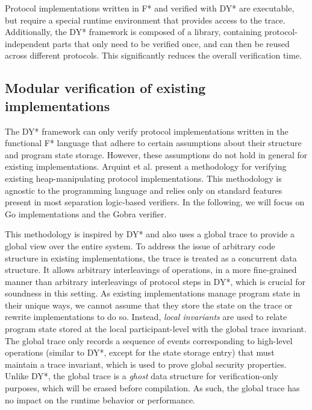\documentclass{article}
\begin{document}
Protocol implementations written in F* and verified with DY* are executable, but require a special runtime environment that provides access to the trace. Additionally, the DY* framework is composed of a library, containing protocol-independent parts that only need to be verified once, and can then be reused across different protocols. This significantly reduces the overall verification time.

\subsection{Modular verification of existing implementations}

The DY* framework can only verify protocol implementations written in the functional F* language that adhere to certain assumptions about their structure and program state storage.
However, these assumptions do not hold in general for existing implementations.
Arquint et al.\cite{arquint2022generic} present a methodology for verifying existing heap-manipulating protocol implementations. This methodology is agnostic to the programming language and relies only on standard features present in most separation logic-based verifiers. In the following, we will focus on Go implementations and the Gobra\cite{wolf2021gobra} verifier.

This methodology is inspired by DY* and also uses a global trace to provide a global view over the entire system.
To address the issue of arbitrary code structure in existing implementations, the trace is treated as a concurrent data structure. It allows arbitrary interleavings of operations, in a more fine-grained manner than arbitrary interleavings of protocol steps in DY*, which is crucial for soundness in this setting.
As existing implementations manage program state in their unique ways, we cannot assume that they store the state on the trace or rewrite implementations to do so. Instead, \emph{local invariants} are used to relate program state stored at the local participant-level with the global trace invariant.
The global trace only records a sequence of events corresponding to high-level operations (similar to DY*, except for the state storage entry) that must maintain a trace invariant, which is used to prove global security properties.
Unlike DY*, the global trace is a \emph{ghost} data structure for verification-only purposes, which will be erased before compilation. As such, the global trace has no impact on the runtime behavior or performance.
\end{document}

